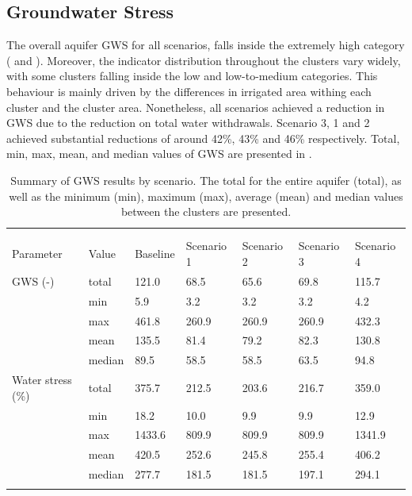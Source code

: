 \subsection{Groundwater Stress}
The overall aquifer GWS for all scenarios, falls inside the extremely high category ( and ). Moreover, the indicator distribution throughout the clusters vary widely, with some clusters falling inside the low and low-to-medium categories. This behaviour is mainly driven by the differences in irrigated area withing each cluster and the cluster area. Nonetheless, all scenarios achieved a reduction in GWS due to the reduction on total water withdrawals. Scenario 3, 1 and 2 achieved substantial reductions of around 42\%, 43\% and 46\% respectively. Total, min, max, mean, and median values of GWS are presented in .

\begin{table}[!h]
	\caption{\label{tbl:gws}Summary of GWS results by scenario. The total for the entire aquifer (total), as well as the minimum (min), maximum (max), average (mean) and median values between the clusters are presented.}
	\lineup
	\footnotesize
	\begin{tabular}{@{}*{7}{l}}
		\br
		&        & \centre{5}{Scenario} \\
		\ns
		&        & \crule{5} \\
		Parameter & Value  &  Baseline &  Scenario 1 &  Scenario 2 &  Scenario 3 &  Scenario 4 \\
		\mr
GWS (-) & total &     121.0 &        68.5 &        65.6 &        69.8 &       115.7 \\
        & min &       5.9 &         3.2 &         3.2 &         3.2 &         4.2 \\
        & max &     461.8 &       260.9 &       260.9 &       260.9 &       432.3 \\
        & mean &     135.5 &        81.4 &        79.2 &        82.3 &       130.8 \\
        & median &      89.5 &        58.5 &        58.5 &        63.5 &        94.8 \\
Water stress (\%) & total &     375.7 &       212.5 &       203.6 &       216.7 &       359.0 \\
        & min &      18.2 &        10.0 &         9.9 &         9.9 &        12.9 \\
        & max &    1433.6 &       809.9 &       809.9 &       809.9 &      1341.9 \\
        & mean &     420.5 &       252.6 &       245.8 &       255.4 &       406.2 \\
        & median &     277.7 &       181.5 &       181.5 &       197.1 &       294.1 \\
		\br
	\end{tabular}
\end{table}

